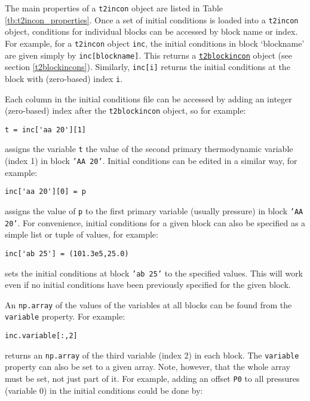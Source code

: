 The main properties of a \texttt{t2incon} object are listed in Table \ref{tb:t2incon_properties}.  Once a set of initial conditions is loaded into a \texttt{t2incon} object, conditions for individual blocks can be accessed by block name or index.  For example, for a \texttt{t2incon} object \texttt{inc}, the initial conditions in block `blockname' are given simply by \texttt{inc[blockname]}.  This returns a \hyperref[t2blockincons]{\texttt{t2blockincon}} object (see section \ref{t2blockincons}).  Similarly, \texttt{inc[i]} returns the initial conditions at the block with (zero-based) index \texttt{i}.

Each column in the initial conditions file can be accessed by adding an integer (zero-based) index after the \texttt{t2blockincon} object, so for example:

\begin{lstlisting}
t = inc['aa 20'][1]
\end{lstlisting}

assigns the variable \texttt{t} the value of the second primary thermodynamic variable (index 1) in block \texttt{'AA 20'}.  Initial conditions can be edited in a similar way, for example:

\begin{lstlisting}
inc['aa 20'][0] = p
\end{lstlisting}

assigns the value of \texttt{p} to the first primary variable (usually pressure) in block \texttt{'AA 20'}.  For convenience, initial conditions for a given block can also be specified as a simple list or tuple of values, for example:

\begin{lstlisting}
inc['ab 25'] = (101.3e5,25.0)
\end{lstlisting}

sets the initial conditions at block \texttt{'ab 25'} to the specified values.  This will work even if no initial conditions have been previously specified for the given block.

An \texttt{np.array} of the values of the variables at all blocks can be found from the \texttt{variable} property.  For example:

\begin{lstlisting}
inc.variable[:,2]
\end{lstlisting}

returns an \texttt{np.array} of the third variable (index 2) in each block.  The \texttt{variable} property can also be set to a given array.  Note, however, that the whole array must be set, not just part of it.  For example, adding an offset \texttt{P0} to all pressures (variable 0) in the initial conditions could be done by:

